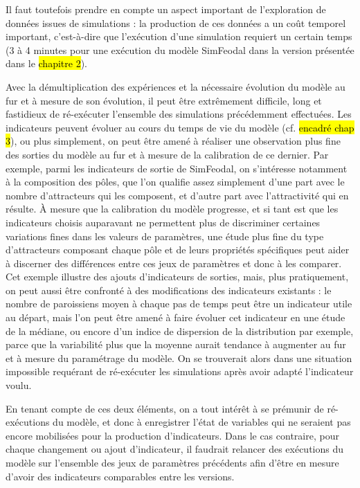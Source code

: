 	Il faut toutefois prendre en compte un aspect important de l'exploration de données issues de simulations : la production de ces données a un coût temporel important, c'est-à-dire que l'exécution d'une simulation requiert un certain temps (3 à 4 minutes pour une exécution du modèle SimFeodal dans la version présentée dans le \hl{chapitre 2}).
	
	Avec la démultiplication des expériences et la nécessaire évolution du modèle au fur et à mesure de son évolution, il peut être extrêmement difficile, long et fastidieux de ré-exécuter l'ensemble des simulations précédemment effectuées.
	Les indicateurs peuvent évoluer au cours du temps de vie du modèle (cf. \hl{encadré chap 3}), ou plus simplement, on peut être amené à réaliser une observation plus fine des sorties du modèle au fur et à mesure de la calibration de ce dernier.
	Par exemple, parmi les indicateurs de sortie de SimFeodal, on s'intéresse notamment à la composition des pôles, que l'on qualifie assez simplement d'une part avec le nombre d'attracteurs qui les composent, et d'autre part avec l'attractivité qui en résulte.
	À mesure que la calibration du modèle progresse, et si tant est que les indicateurs choisis auparavant ne permettent plus de discriminer certaines variations fines dans les valeurs de paramètres, une étude plus fine du type d'attracteurs composant chaque pôle et de leurs propriétés spécifiques peut aider à discerner des différences entre ces jeux de paramètres et donc à les comparer.
	Cet exemple illustre des ajouts d'indicateurs de sorties, mais, plus pratiquement, on peut aussi être confronté à des modifications des indicateurs existants : le nombre de paroissiens moyen à chaque pas de temps peut être un indicateur utile au départ, mais l'on peut être amené à faire évoluer cet indicateur en une étude de la médiane, ou encore d'un indice de dispersion de la distribution par exemple, parce que la variabilité plus que la moyenne aurait tendance à augmenter au fur et à mesure du paramétrage du modèle.
	On se trouverait alors dans une situation impossible requérant de ré-exécuter les simulations après avoir adapté l'indicateur voulu.
	
	En tenant compte de ces deux éléments, on a tout intérêt à se prémunir de ré-exécutions du modèle, et donc à enregistrer l'état de variables qui ne seraient pas encore mobilisées pour la production d'indicateurs.	
	Dans le cas contraire, pour chaque changement ou ajout d'indicateur, il faudrait relancer des exécutions du modèle sur l'ensemble des jeux de paramètres précédents afin d'être en mesure d'avoir des indicateurs comparables entre les versions.


